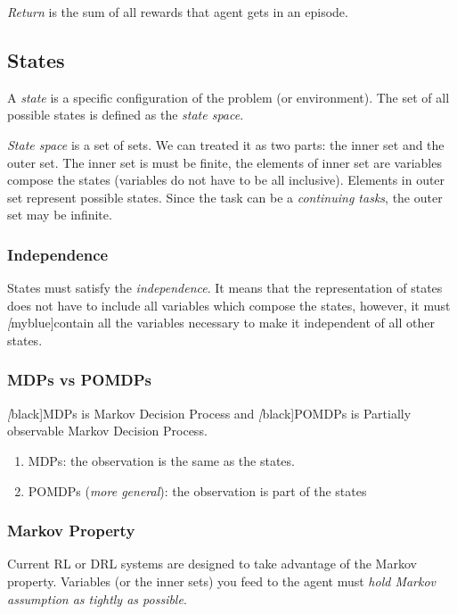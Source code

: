     \emph{Return} is the sum of all rewards that agent gets in an episode. \par

    \subsection{States}
    A \emph{state} is a specific configuration of  the problem (or environment). The set of all possible states is defined as the \emph{state space}. \par
    \emph{State space} is a set of sets. We can treated it as two parts: the inner set and the outer set. The inner set is must be finite, the elements of inner set are variables compose the states (variables do not have to be all inclusive). Elements in outer set represent possible states. Since the task can be a {\itshape continuing tasks},  the outer set may be infinite.

    \subsubsection*{Independence}
    States must satisfy the \emph{independence}. It means that the representation of states does not have to include all variables which compose the states, however, it must \emph[myblue]{contain all the variables necessary to make it independent of all other states}. \par

    \subsubsection*{MDPs vs POMDPs}
    \emph[black]{MDPs} is Markov Decision Process and \emph[black]{POMDPs} is Partially observable Markov Decision Process. \par
    \begin{enumerate}
        \item MDPs: the observation is the same as the states.
        \item POMDPs ({\itshape more general}): the observation is part of the states
    \end{enumerate}

    \subsubsection*{Markov Property}
    Current RL or DRL systems are designed to take advantage of the Markov property. Variables (or the inner sets) you feed to the agent must \emph{hold Markov assumption as tightly as possible}.

